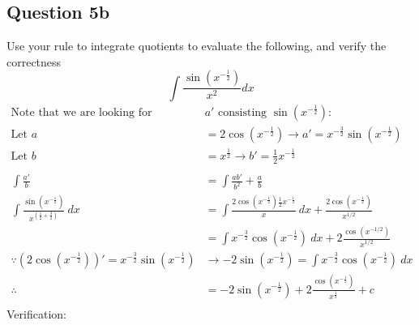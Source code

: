 \documentclass{article}
\begin{document}
\subsection*{Question 5b}
Use your rule to integrate quotients to evaluate the following, and verify the correctness
\[\int\frac{\sin{(x^{-\frac{1}{2}})}}{x^2}dx\]
\begin{align*}
    \text{Note that we are looking for }                                        & a'\text{ consisting }\sin(x^{-\frac{1}{2}}):                                                                     \\
    \text{Let }a                                                                & = 2\cos(x^{-\frac{1}{2}}) \rightarrow a' =x^{-\frac{3}{2}}\sin(x^{-\frac{1}{2}})                                 \\
    \text{Let }b                                                                & = x^{\frac{1}{2}} \rightarrow b' = \frac{1}{2}x^{-\frac{1}{2}}                                                   \\
    \\
    \int\frac{a'}{b}                                                            & = \int\frac{ab'}{b^2} + \frac{a}{b}                                                                              \\
    \int\frac{\sin{(x^{-\frac{1}{2}})}}{x^{(\frac{1}{2}+\frac{3}{2})}}\:dx      & = \int\frac{2\cos(x^{-\frac{1}{2}})\frac{1}{2}x^{-\frac{1}{2}}}{x}\:dx + \frac{2\cos(x^{-\frac{1}{2}})}{x^{1/2}} \\
                                                                                & = \int x^{-\frac{3}{2}}\cos(x^{-\frac{1}{2}})\:dx + 2\frac{\cos(x^{-1/2})}{x^{1/2}}                              \\
    \because (2\cos(x^{-\frac{1}{2}}))' =x^{-\frac{3}{2}}\sin(x^{-\frac{1}{2}}) & \rightarrow-2\sin(x^{-\frac{1}{2}}) = \int x^{-\frac{3}{2}}\cos(x^{-\frac{1}{2}})\:dx                            \\
    \therefore                                                                  & = -2\sin(x^{-\frac{1}{2}}) + 2\frac{\cos(x^{-\frac{1}{2}})}{x^{\frac{1}{2}}} + c                                 \\
\end{align*}
Verification:
\end{document}
